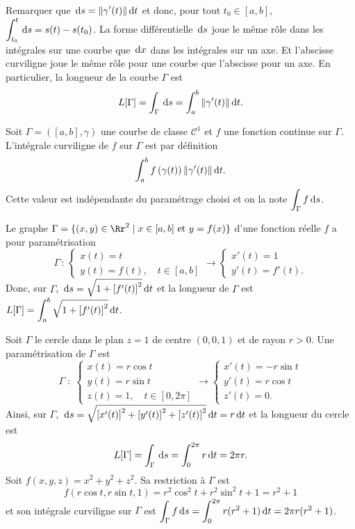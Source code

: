 \documentclass[class=report,crop=false]{standalone}
\begin{document}
\vskip4mm

\noindent Remarquer que $\displaystyle \,\mathrm{d} s=\|\gamma '(t)\|\,\mathrm{d} t$ et donc, pour tout $t_0\in [a,b]$, $\displaystyle \int _{t_0}^t\,\mathrm{d} s=s(t)-s(t_0)$. La forme différentielle $\,\mathrm{d} s$ joue le m\^eme r\^ole dans les intégrales sur une courbe que $\,\mathrm{d} x$ dans les intégrales sur un axe. Et l'abscisse curviligne joue le m\^eme r\^ole pour une courbe que l'abscisse pour un axe. En particulier, la longueur de la courbe $\Gamma$ est
$$L[\Gamma ]=\int _{\Gamma}\,\mathrm{d} s=\int _a^b\|\gamma '(t)\|\,\mathrm{d} t.$$

\vskip6mm

\begin{definition}[\bf Proposition]Soit $\Gamma=([a,b],\gamma)$ une courbe de classe $\mathscr{C}^1$ et $f$ une fonction continue sur $\Gamma$. L'intégrale curviligne de $f$ sur $\Gamma$ est par définition 
$$\int _a^bf\left(\gamma(t)\right)\|\gamma '(t)\|\,\mathrm{d} t.$$
Cette valeur est indépendante du paramétrage choisi et on la note $\displaystyle \int _{\Gamma}f\,\mathrm{d} s$.
\end{definition}

\vskip4mm

Le graphe $\Gamma =\{(x,y)\in \Rr^2\mid x\in [a,b]\mbox{ et }y=f(x)\}$ d'une fonction réelle $f$ a pour paramétrisation
$$\Gamma\,:\,\left\{\begin{array}{l}x(t)=t\\ y(t)=f(t),\quad t\in [a,b]\end{array}\right. \rightarrow \left\{\begin{array}{l}x'(t)=1 \\ y'(t)=f'(t).\end{array}\right.$$
Donc, sur $\Gamma$, $\,\mathrm{d} s=\sqrt{1+\left[f'(t)\right]^2}\,\mathrm{d} t$ et la longueur de $\Gamma $ est $\displaystyle L[\Gamma]=\int _a^b\sqrt{1+\left[f'(t)\right]^2}\,\mathrm{d} t$.

\vskip6mm

Soit $\Gamma$ le cercle dans le plan $z=1$ de centre $(0,0,1)$ et de rayon $r>0$. Une paramétrisation de $\Gamma$ est 
$$\Gamma\; :\; \left\{\begin{array}{l}x(t)=r\cos t \\ y(t)=r\sin t\\ z(t)=1,\quad t\in [0,2\pi]\end{array}\right. \rightarrow \left\{\begin{array}{l}x'(t)=-r\sin t \\ y'(t)=r\cos t\\ z'(t)=0.\end{array}\right.$$
Ainsi, sur $\Gamma$, $\,\mathrm{d} s=\sqrt{\left[x'(t)\right]^2+\left[y'(t)\right]^2+\left[z'(t)\right]^2}\,\mathrm{d} t=r\,\mathrm{d} t$ et la longueur du cercle est
$$L[\Gamma]=\int _{\Gamma}\,\mathrm{d} s=\int _0^{2\pi}r\,\mathrm{d} t=2\pi r.$$
Soit $f(x,y,z)=x^2+y^2+z^2$. Sa restriction à $\Gamma$ est
$$f(r\cos t,r\sin t,1)=r^2\cos ^2t+r^2\sin ^2t+1=r^2+1$$
et son intégrale curviligne sur $\Gamma$ est $\displaystyle \int _{\Gamma}f\,\mathrm{d} s=\int _0^{2\pi}r(r^2+1)\,\mathrm{d} t=2\pi r(r^2+1)$.
\end{document}

